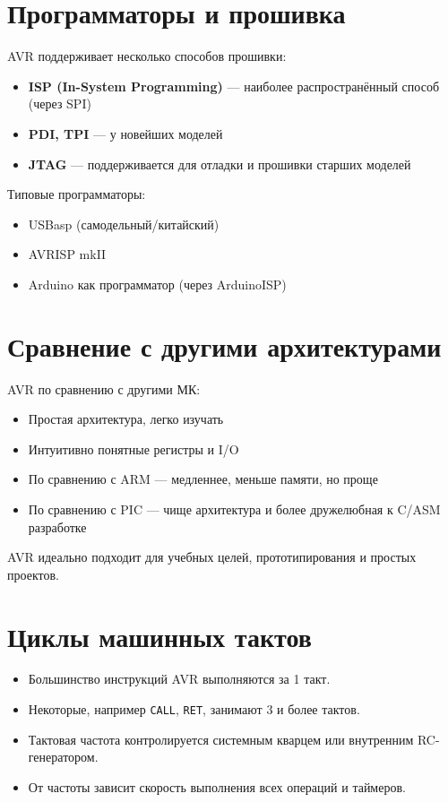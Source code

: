\documentclass[a4paper,12pt]{article}
\begin{document}
\section{Программаторы и прошивка}
AVR поддерживает несколько способов прошивки:
\begin{itemize}
    \item \textbf{ISP (In-System Programming)} — наиболее распространённый способ (через SPI)
    \item \textbf{PDI, TPI} — у новейших моделей
    \item \textbf{JTAG} — поддерживается для отладки и прошивки старших моделей
\end{itemize}
Типовые программаторы:
\begin{itemize}
    \item USBasp (самодельный/китайский)
    \item AVRISP mkII
    \item Arduino как программатор (через ArduinoISP)
\end{itemize}

\section{Сравнение с другими архитектурами}
AVR по сравнению с другими МК:
\begin{itemize}
    \item Простая архитектура, легко изучать
    \item Интуитивно понятные регистры и I/O
    \item По сравнению с ARM — медленнее, меньше памяти, но проще
    \item По сравнению с PIC — чище архитектура и более дружелюбная к C/ASM разработке
\end{itemize}
AVR идеально подходит для учебных целей, прототипирования и простых проектов.

\section{Циклы машинных тактов}
\begin{itemize}
    \item Большинство инструкций AVR выполняются за 1 такт.
    \item Некоторые, например \texttt{CALL}, \texttt{RET}, занимают 3 и более тактов.
    \item Тактовая частота контролируется системным кварцем или внутренним RC-генератором.
    \item От частоты зависит скорость выполнения всех операций и таймеров.
\end{itemize}
\end{document}

